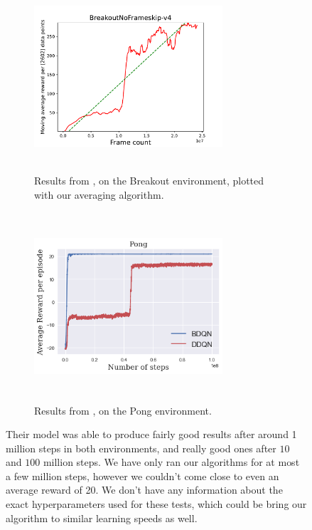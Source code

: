 \documentclass{article}
\begin{document}
\begin{figure}[H]
\centering
\begin{subfigure}{.5\textwidth}
  \centering
  \includegraphics[width=7cm,height=7cm,keepaspectratio]{img/BreakoutNoFrameskipv4.pdf}
  \caption{Results from \cite{BDQN}, on the Breakout environment, plotted with our averaging algorithm.}
  \label{fig:sub1}
\end{subfigure}%
\begin{subfigure}{.5\textwidth}
  \centering
  \includegraphics[width=7cm,height=7cm,keepaspectratio]{img/Pong.png}
  \caption{Results from \cite{BDQN}, on the Pong environment.}
  \label{fig:sub2}
\end{subfigure}
\caption{Their model was able to produce fairly good results after around 1 million steps in both environments, and really good ones after $10$ and $100$ million steps. We have only ran our algorithms for at most a few million steps, however we couldn't come close to even an average reward of 20. We don't have any information about the exact hyperparameters used for these tests, which could be bring our algorithm to similar learning speeds as well.}
\end{figure}
\end{document}
